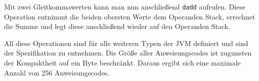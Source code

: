 Mit zwei Gleitkommawerten kann man nun anschließend \texttt{dadd} aufrufen. Diese Operation entnimmt die beiden obersten Werte dem Operanden Stack, errechnet die Summe und legt diese anschließend wieder auf den Operanden Stack.

All diese Operationen sind für alle weiteren Typen der JVM definiert und sind der Spezifikation zu entnehmen. Die Größe aller Anweisungscodes ist zugunsten der Kompaktheit auf ein Byte beschränkt. Daraus ergibt sich eine maximale Anzahl von 256 Anweisungscodes.